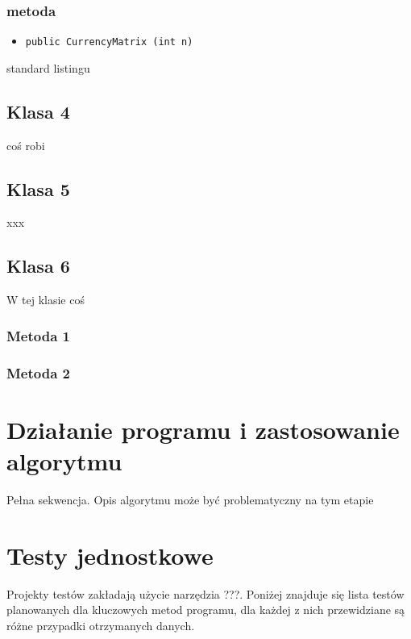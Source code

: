 \documentclass[a4paper,11pt]{article}
\newcommand\tab[1][0.6cm]{\hspace*{#1}}
\begin{document}
\subsubsection{metoda}
\begin{itemize}
\item \begin{lstlisting}
public CurrencyMatrix (int n)
\end{lstlisting}
\end{itemize}

\tab standard listingu

\subsection{Klasa 4}

\tab coś robi


\subsection{Klasa 5}

\tab xxx

\subsection{Klasa 6}

\tab W tej klasie coś

\subsubsection{Metoda 1}



\subsubsection{Metoda 2}



\section{Działanie programu i zastosowanie algorytmu}

\tab Pełna sekwencja. Opis algorytmu może być problematyczny na tym etapie

\section{Testy jednostkowe}

\tab Projekty testów zakładają użycie narzędzia ???. Poniżej znajduje się lista testów planowanych dla kluczowych metod programu, dla każdej z nich przewidziane są różne przypadki otrzymanych danych. 
\end{document}
